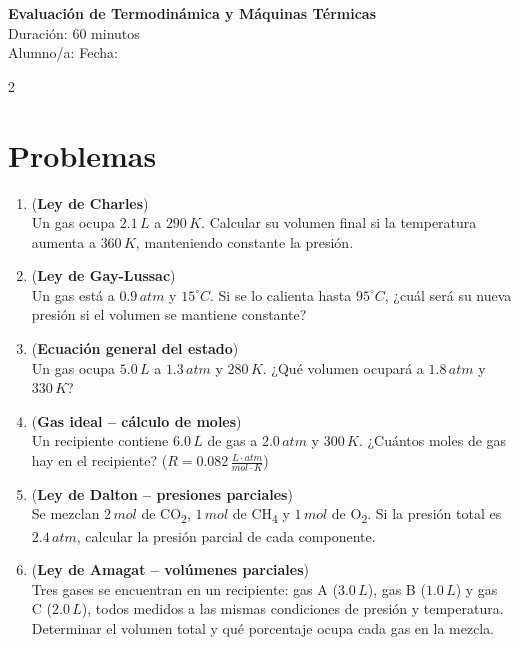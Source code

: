 \documentclass[a4paper,12pt]{article}
\begin{document}
\begin{center}
    \Large \textbf{Evaluación de Termodinámica y Máquinas Térmicas} \\
    \normalsize Duración: 60 minutos \\
    Alumno/a: \underline{\hspace{6cm}} \hspace{0.5cm} Fecha: \underline{\hspace{2cm}}
\end{center}

\vspace{0.3cm}

\begin{multicols}{2}

\section*{Problemas}

\begin{enumerate}
\item (\textbf{Ley de Charles})\\
Un gas ocupa $2.1\,L$ a $290\,K$. Calcular su volumen final si la temperatura aumenta a $360\,K$, manteniendo constante la presión.

\item (\textbf{Ley de Gay-Lussac})\\
Un gas está a $0.9\,atm$ y $15^\circ C$. Si se lo calienta hasta $95^\circ C$, ¿cuál será su nueva presión si el volumen se mantiene constante?

\item (\textbf{Ecuación general del estado})\\
Un gas ocupa $5.0\,L$ a $1.3\,atm$ y $280\,K$. ¿Qué volumen ocupará a $1.8\,atm$ y $330\,K$?

\item (\textbf{Gas ideal – cálculo de moles})\\
Un recipiente contiene $6.0\,L$ de gas a $2.0\,atm$ y $300\,K$. ¿Cuántos moles de gas hay en el recipiente? ($R = 0.082\,\frac{L \cdot atm}{mol \cdot K}$)

\item (\textbf{Ley de Dalton – presiones parciales})\\
Se mezclan $2\,mol$ de CO\textsubscript{2}, $1\,mol$ de CH\textsubscript{4} y $1\,mol$ de O\textsubscript{2}. Si la presión total es $2.4\,atm$, calcular la presión parcial de cada componente.

\item (\textbf{Ley de Amagat – volúmenes parciales})\\
Tres gases se encuentran en un recipiente: gas A ($3.0\,L$), gas B ($1.0\,L$) y gas C ($2.0\,L$), todos medidos a las mismas condiciones de presión y temperatura. Determinar el volumen total y qué porcentaje ocupa cada gas en la mezcla.

\end{enumerate}

\vspace{0.2cm}

\end{multicols}
\end{document}

